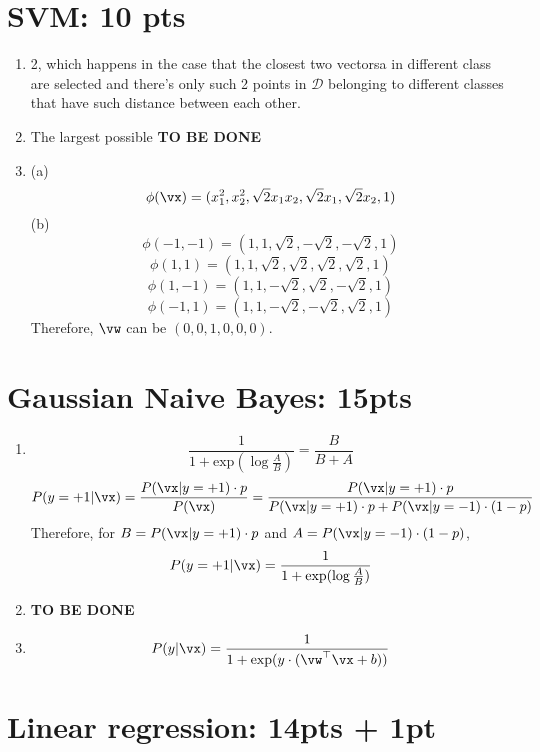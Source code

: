 \documentclass[12pt]{article}
\begin{document}
\section{SVM: 10 pts}
\begin{enumerate}
    \item 2, which happens in the case that the closest two vectorsa in different class are
    selected and there's only such 2 points in $\mathcal{D}$ belonging to different classes that have such distance between each other.
    \item The largest possible \textbf{TO BE DONE}
    \item (a) \[\phi(\vx) = (x_1^2, x_2^2, \sqrt2x_1x_2, \sqrt2x_1, \sqrt2x_2, 1)\]
    (b)
    \[\phi(-1, -1) = (1, 1, \sqrt2, -\sqrt2, -\sqrt2, 1)\]
    \[\phi(1, 1) = (1, 1, \sqrt2, \sqrt2, \sqrt2, \sqrt2, 1)\]
    \[\phi(1, -1) = (1, 1, -\sqrt2, \sqrt2, -\sqrt2, 1)\]
    \[\phi(-1, 1) = (1, 1, -\sqrt2, -\sqrt2, \sqrt2, 1)\]
    Therefore, $\vw$ can be $(0, 0, 1, 0, 0, 0)$.
\end{enumerate}

\section{Gaussian Naive Bayes: 15pts}
\begin{enumerate}
    \item 
    \[\frac{1}{1+\text{exp}(\log\frac{A}{B})} = \frac{B}{B+A}\]
    \[P(y=+1|\vx) = \frac{P(\vx|y=+1) \cdot p}{P(\vx)} = \frac{P(\vx|y=+1) \cdot p}{P(\vx|y=+1) \cdot p + P(\vx|y=-1) \cdot (1-p)}\]
    Therefore, for $B = P(\vx|y=+1) \cdot p$ and $A = P(\vx|y=-1) \cdot (1-p)$, 
    \[P(y=+1|\vx) = \frac{1}{1+\text{exp}(\log\frac{A}{B})}\]
    \item \textbf{TO BE DONE}
    \item \[P(y|\vx) = \frac{1}{1 + \text{exp}(y\cdot(\vw^{\top}\vx+b))}\]
\end{enumerate}

\section{Linear regression: 14pts + 1pt}
\end{document}
